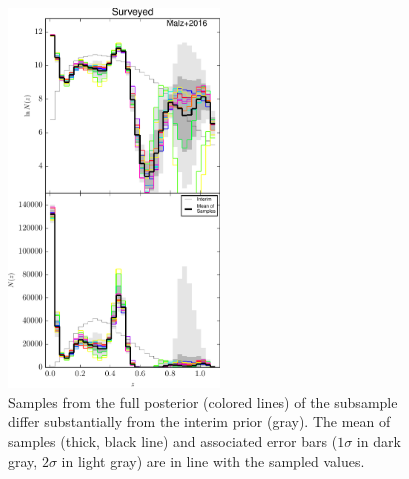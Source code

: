 \documentclass[preprint]{aastex}
\begin{document}
\begin{figure}
\includegraphics[width=0.5\textwidth]{figs/boss/samps.pdf}
\caption{Samples from the full posterior (colored lines) of the subsample 
differ substantially from the interim prior (gray).  The mean of samples 
(thick, black line) and associated error bars ($1\sigma$ in dark gray, 
$2\sigma$ in light gray) are in line with the sampled values.}
\label{fig:dataparam}
\end{figure}
\end{document}
